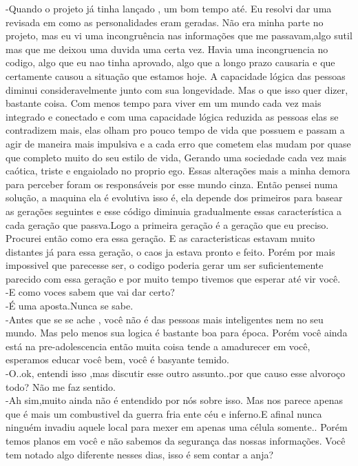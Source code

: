 \documentclass{book}
\begin{document}
 -Quando o projeto já tinha lançado , um bom tempo até. Eu resolvi dar uma revisada em como as personalidades eram geradas. Não era minha parte no projeto, mas eu vi uma incongruência nas informações que me passavam,algo sutil mas que me deixou uma duvida uma certa vez. Havia uma incongruencia no codigo, algo que eu nao tinha aprovado, algo que a longo prazo causaria e que certamente causou a situação que estamos hoje. A capacidade lógica das pessoas diminui consideravelmente junto com sua longevidade. Mas o que isso quer dizer, bastante coisa. Com menos tempo para viver em um mundo cada vez mais integrado e conectado e com uma capacidade lógica reduzida as pessoas elas se contradizem mais, elas olham pro pouco tempo de vida que possuem e passam a agir de maneira mais impulsiva e a cada erro que cometem elas mudam por quase que completo muito do seu estilo de vida, Gerando uma sociedade cada vez mais caótica, triste e engaiolado no proprio ego. Essas alterações mais a minha demora para perceber foram os responsáveis por esse mundo cinza. Então pensei numa solução, a maquina ela é evolutiva isso é, ela depende dos primeiros para basear as gerações seguintes e esse código diminuia gradualmente essas característica a cada geração que passva.Logo a primeira geração é a geração que eu preciso. Procurei então como era essa geração. E as caracteristicas estavam muito distantes já para essa geração, o caos ja estava pronto e feito. Porém por mais impossivel que parecesse ser, o codigo poderia gerar um ser suficientemente parecido com essa geração e por muito tempo tivemos que esperar até vir você.\\
 -E como voces sabem que vai dar certo?\\
 -É uma aposta.Nunca se sabe.\\
 -Antes que se se ache , você não é das pessoas mais inteligentes nem no seu mundo. Mas pelo menos sua logica é bastante boa para época. Porém você ainda está na pre-adolescencia então muita coisa tende a amadurecer em você, esperamos educar você bem, você é basyante temido.\\
 -O..ok, entendi isso ,mas discutir esse outro assunto..por que causo esse alvoroço todo? Não me faz sentido.\\
 -Ah sim,muito ainda não é entendido por nós sobre isso. Mas nos parece apenas que é mais um combustivel da guerra fria ente céu e inferno.E afinal nunca ninguém invadiu aquele local para mexer em apenas uma célula somente.. Porém temos planos em você e não sabemos da segurança das nossas informações. Você tem notado algo diferente nesses dias, isso é sem contar a anja?\\
\end{document}
